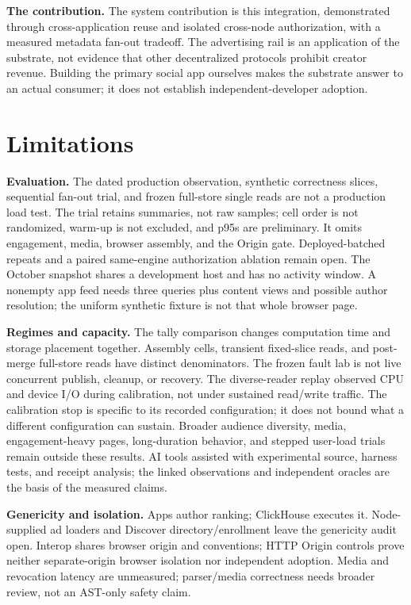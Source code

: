 \documentclass[sigconf, nonacm]{acmart}
\begin{document}
\textbf{The contribution.} The system contribution is this integration,
demonstrated through cross-application reuse and isolated cross-node
authorization, with a measured metadata fan-out tradeoff. The advertising
rail is an application of the substrate, not evidence that other
decentralized protocols prohibit creator revenue. Building the primary
social app ourselves makes the substrate answer to an actual consumer;
it does not establish independent-developer adoption.

\section{Limitations}
\label{sec:limitations}

\textbf{Evaluation.} The dated production observation, synthetic correctness
slices, sequential fan-out trial, and frozen full-store single reads are not
a production load test.
The trial retains summaries, not raw samples; cell order is not randomized,
warm-up is not excluded, and p95s are preliminary. It omits engagement,
media, browser assembly, and the Origin gate. Deployed-batched repeats and a
paired same-engine authorization ablation remain open. The October snapshot
shares a development host and has no activity window. A nonempty app feed
needs three queries plus content views and possible author resolution;
the uniform synthetic fixture is not that whole browser page.

\textbf{Regimes and capacity.} The tally comparison changes computation time
and storage placement together. Assembly cells, transient fixed-slice reads,
and post-merge full-store reads have distinct denominators. The frozen fault
lab is not live concurrent publish, cleanup, or recovery. The diverse-reader
replay observed CPU and device I/O during calibration, not under sustained
read/write traffic. The calibration stop is specific to its recorded
configuration; it does not bound what a different configuration can sustain.
Broader audience diversity, media,
engagement-heavy pages, long-duration behavior, and stepped user-load trials
remain outside these results. AI tools assisted with experimental source,
harness tests, and receipt analysis; the linked observations and independent
oracles are the basis of the measured claims.

\textbf{Genericity and isolation.} Apps author ranking; ClickHouse executes
it. Node-supplied ad loaders and Discover directory/enrollment leave the
genericity audit open. Interop shares browser origin and conventions;
HTTP Origin controls prove neither separate-origin browser isolation nor
independent adoption. Media and revocation latency are unmeasured;
parser/media correctness needs broader review, not an AST-only safety claim.
\end{document}

